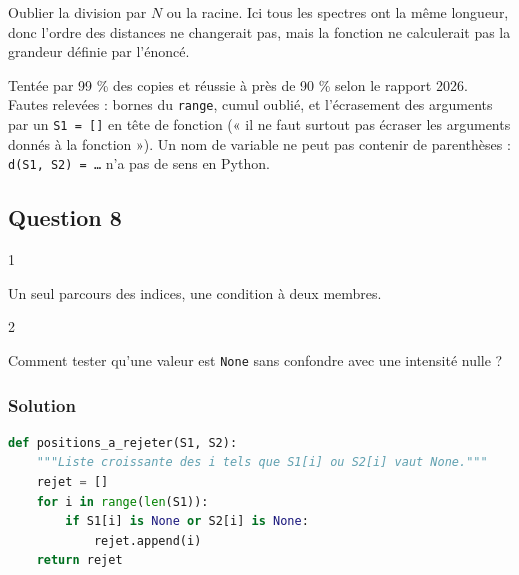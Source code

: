 \documentclass[11pt,a4paper]{article}
\begin{document}
\begin{piege}

Oublier la division par \(N\) ou la racine. Ici tous les spectres ont la même longueur, donc l'ordre des distances ne changerait pas, mais la fonction ne calculerait pas la grandeur définie par l'énoncé.

\end{piege}

\begin{jury}

Tentée par 99 \% des copies et réussie à près de 90 \% selon le rapport 2026. Fautes relevées : bornes du \texttt{range}, cumul oublié, et l'écrasement des arguments par un \texttt{S1\ =\ {[}{]}} en tête de fonction (« il ne faut surtout pas écraser les arguments donnés à la fonction »). Un nom de variable ne peut pas contenir de parenthèses : \texttt{d(S1,\ S2)\ =\ …} n'a pas de sens en Python.

\end{jury}

\hypertarget{question-8}{%
\subsection{Question 8}\label{question-8}}

\begin{indication}{1}

Un seul parcours des indices, une condition à deux membres.

\end{indication}

\begin{indication}{2}

Comment tester qu'une valeur est \texttt{None} sans confondre avec une intensité nulle ?

\end{indication}

\hypertarget{solution-7}{%
\subsubsection{Solution}\label{solution-7}}

\begin{lstlisting}[language=Python]
def positions_a_rejeter(S1, S2):
    """Liste croissante des i tels que S1[i] ou S2[i] vaut None."""
    rejet = []
    for i in range(len(S1)):
        if S1[i] is None or S2[i] is None:
            rejet.append(i)
    return rejet
\end{lstlisting}
\end{document}
